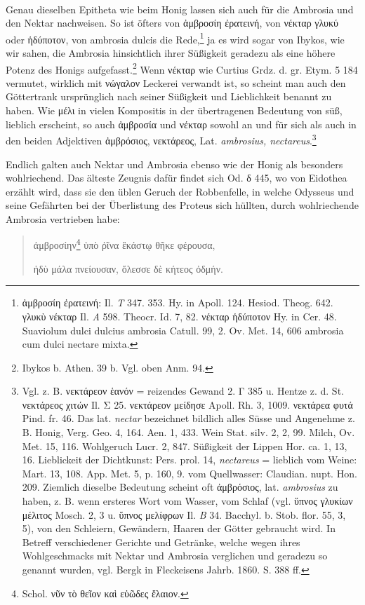 \documentclass[a4paper, 11pt, oneside]{article}
\begin{document}
\paragraph{}
Genau dieselben Epitheta wie beim Honig lassen sich auch für die Ambrosia und den Nektar nachweisen. So ist öfters von ἀμβροσίη ἐρατεινή, von νέκταρ γλυκύ oder ἡδύποτον, von ambrosia dulcis die Rede,\footnote{ἀμβροσίη ἐρατεινή: Il. \emph{T} 347. 353. Hy. in Apoll. 124. Hesiod. Theog. 642. γλυκὺ νέκταρ Il. \emph{A} 598. Theocr. Id. 7, 82. νέκταρ ἡδύποτον Hy. in Cer. 48. Suaviolum dulci dulcius ambrosia Catull. 99, 2. Ov. Met. 14, 606 ambrosia cum dulci nectare mixta.} ja es wird sogar von Ibykos, wie wir sahen, die Ambrosia hinsichtlich ihrer Süßigkeit geradezu als eine höhere Potenz des Honigs aufgefasst.\footnote{Ibykos b. Athen. 39 b. Vgl. oben Anm. 94.} Wenn νέκταρ wie Curtius Grdz. d. gr. Etym. 5 184 vermutet, wirklich mit νώγαλον Leckerei verwandt ist, so scheint man auch den Göttertrank ursprünglich nach seiner Süßigkeit und Lieblichkeit benannt zu haben. Wie μέλι in vielen Kompositis in der übertragenen Bedeutung von süß, lieblich erscheint, so auch ἀμβροσία und νέκταρ sowohl an und für sich als auch in den beiden Adjektiven ἀμβρόσιος, νεκτάρεος, Lat. \emph{ambrosius, nectareus}.\footnote{Vgl. z. B. νεκτάρεον ἑανόν = reizendes Gewand 2. Γ 385 u. Hentze z. d. St. νεκτάρεος χιτών Il. Σ 25. νεκτάρεον μείδησε Apoll. Rh. 3, 1009. νεκτάρεα φυτά Pind. fr. 46. Das lat. \emph{nectar} bezeichnet bildlich alles Süsse und Angenehme z. B. Honig, Verg. Geo. 4, 164. Aen. 1, 433. Wein Stat. silv. 2, 2, 99. Milch, Ov. Met. 15, 116. Wohlgeruch Lucr. 2, 847. Süßigkeit der Lippen Hor. ca. 1, 13, 16. Lieblickeit der Dichtkunst: Pers. prol. 14, \emph{nectareus} = lieblich vom Weine: Mart. 13, 108. App. Met. 5, p. 160, 9. vom Quellwasser: Claudian. nupt. Hon. 209. Ziemlich dieselbe Bedeutung scheint oft ἀμβρόσιος, lat. \emph{ambrosius} zu haben, z. B. wenn ersteres Wort vom Wasser, vom Schlaf (vgl. ὕπνος γλυκίων μέλιτος Mosch. 2, 3 u. ὕπνος μελίφρων Il. \emph{B} 34. Bacchyl. b. Stob. flor. 55, 3, 5), von den Schleiern, Gewändern, Haaren der Götter gebraucht wird. In Betreff verschiedener Gerichte und Getränke, welche wegen ihres Wohlgeschmacks mit Nektar und Ambrosia verglichen und geradezu so genannt wurden, vgl. Bergk in Fleckeisens Jahrb. 1860. S. 388 ff.}

Endlich galten auch Nektar und Ambrosia ebenso wie der Honig als besonders wohlriechend. Das älteste Zeugnis dafür findet sich Od. δ 445, wo von Eidothea erzählt wird, dass sie den üblen Geruch der Robbenfelle, in welche Odysseus und seine Gefährten bei der Überlistung des Proteus sich hüllten, durch wohlriechende Ambrosia vertrieben habe:
\begin{quotation}\large
ἀμβροσίην\footnote{Schol. νῦν τὸ θεῖον καὶ εὐῶδες ἔλαιον.} ὑπὸ ῥῖνα ἓκάστῳ θῆκε φέρουσα,

ἡδὺ μάλα πνείουσαν, ὅλεσσε δὲ κήτεος ὀδμήν.
\end{quotation}
\end{document}
